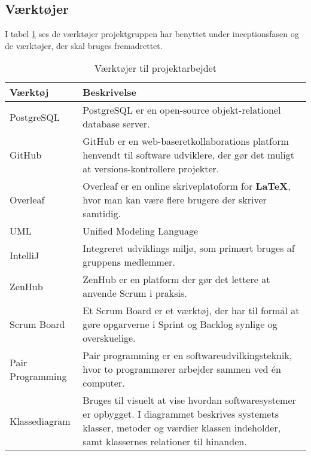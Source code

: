 \subsection{Værktøjer}
I tabel \ref{tab:tools} ses de værktøjer projektgruppen har benyttet under inceptionsfasen og de værktøjer, der skal bruges fremadrettet.
\begin{table}[ht]
    \begin{tabularx}{\textwidth}{|p{4cm}|X|}
        \hline
        \textbf{Værktøj} & \textbf{Beskrivelse} \\
        \hline
        PostgreSQL          &   PostgreSQL er en open-source objekt-relationel database server.\\
        \hline
        GitHub              &   GitHub er en web-baseretkollaborations platform henvendt til software udviklere, der gør det muligt at versions-kontrollere projekter.\\ 
        \hline
        Overleaf            &   Overleaf er en online skriveplatoform for \textbf{LaTeX}, hvor man kan være flere brugere der skriver samtidig. \\
        \hline
        UML                 &   Unified Modeling Language \\
        \hline
        IntelliJ            &   Integreret udviklings miljø, som primært bruges af gruppens medlemmer. \\
        \hline
        ZenHub              &   ZenHub er en platform der gør det lettere at anvende Scrum i praksis.  \\
        \hline
        Scrum Board         &   Et Scrum Board er et værktøj, der har til formål at gøre opgarverne i Sprint og Backlog synlige og overskuelige.\\
        \hline
        Pair Programming    &   Pair programming er en softwareudvilkingsteknik, hvor to programmører arbejder sammen ved én computer.\\
        \hline
        Klassediagram       &   Bruges til visuelt at vise hvordan softwaresystemer er opbygget. I diagrammet beskrives systemets klasser, metoder og værdier klassen indeholder, samt klassernes relationer til hinanden.\\
        \hline
    \end{tabularx}
    \caption{Værktøjer til projektarbejdet}
    \label{tab:tools}
\end{table}



